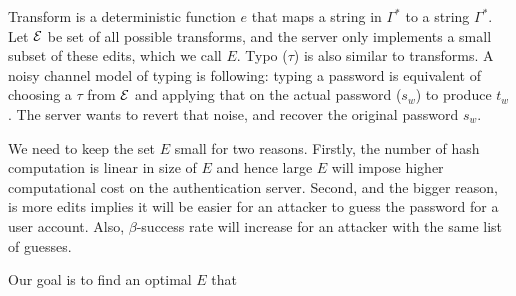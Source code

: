 Transform is a deterministic function $e$ that maps a string in $\Gamma^*$ to a
string $\Gamma^*$. Let ${\mathcal{E}}$ be set of all possible transforms, and the server
only implements a small subset of these edits, which we call $E$.  Typo ($\tau$)
is also similar to transforms.  A noisy channel model of typing is following:
typing a password is equivalent of choosing a $\tau$ from ${\mathcal{E}}$ and applying that
on the actual password ($s_w$) to produce $t_w$. The server wants to revert that
noise, and recover the original password $s_w$.

We need to keep the set $E$ small for two reasons. Firstly, the number of hash
computation is linear in size of $E$ and hence large $E$ will impose higher
computational cost on the authentication server. Second, and the bigger reason,
is more edits implies it will be easier for an attacker to guess the password
for a user account. Also, $\beta$-success rate will increase for an attacker
with the same list of guesses.

Our goal is to find an optimal $E$ that 




